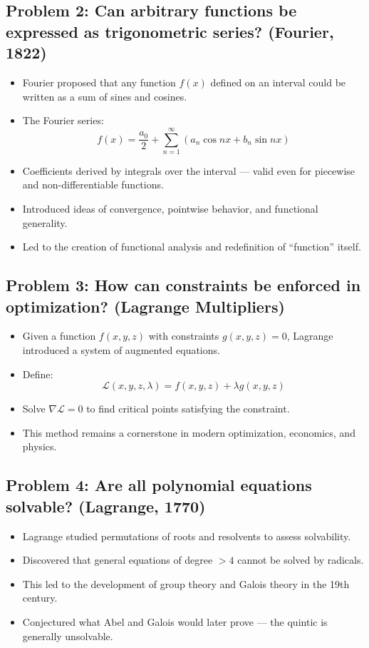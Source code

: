 \documentclass[9pt]{article}
\begin{document}
\subsection*{Problem 2: Can arbitrary functions be expressed as trigonometric series? (Fourier, 1822)}
\begin{itemize}
  \item Fourier proposed that any function \( f(x) \) defined on an interval could be written as a sum of sines and cosines.
  \item The Fourier series:
  \[
  f(x) = \frac{a_0}{2} + \sum_{n=1}^\infty \left( a_n \cos nx + b_n \sin nx \right)
  \]
  \item Coefficients derived by integrals over the interval — valid even for piecewise and non-differentiable functions.
  \item Introduced ideas of convergence, pointwise behavior, and functional generality.
  \item Led to the creation of functional analysis and redefinition of “function” itself.
\end{itemize}

\subsection*{Problem 3: How can constraints be enforced in optimization? (Lagrange Multipliers)}
\begin{itemize}
  \item Given a function \( f(x, y, z) \) with constraints \( g(x, y, z) = 0 \), Lagrange introduced a system of augmented equations.
  \item Define:
  \[
  \mathcal{L}(x, y, z, \lambda) = f(x, y, z) + \lambda g(x, y, z)
  \]
  \item Solve \( \nabla \mathcal{L} = 0 \) to find critical points satisfying the constraint.
  \item This method remains a cornerstone in modern optimization, economics, and physics.
\end{itemize}

\subsection*{Problem 4: Are all polynomial equations solvable? (Lagrange, 1770)}
\begin{itemize}
  \item Lagrange studied permutations of roots and resolvents to assess solvability.
  \item Discovered that general equations of degree \( >4 \) cannot be solved by radicals.
  \item This led to the development of group theory and Galois theory in the 19th century.
  \item Conjectured what Abel and Galois would later prove — the quintic is generally unsolvable.
\end{itemize}
\end{document}
